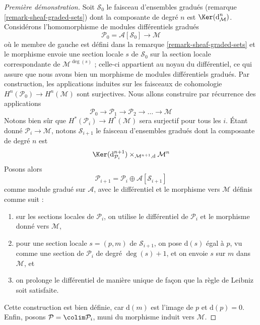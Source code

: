 \begin{proof}[Première démonstration]
Soit $\mathcal{S}_0$ le faisceau d'ensembles
gradués (remarque \ref{remark-sheaf-graded-sets})
dont la composante de degré $n$ est $\Ker(\text{d}_\mathcal{M}^n)$.
Considérons l'homomorphisme de modules différentiels gradués
$$
\mathcal{P}_0 = \mathcal{A}[\mathcal{S}_0] \longrightarrow \mathcal{M}
$$ où
le membre de gauche est défini dans la remarque \ref{remark-sheaf-graded-sets} et
le morphisme envoie une section locale $s$ de $\mathcal{S}_0$ sur
la section locale correspondante de $\mathcal{M}^{\deg(s)}$ ; celle-ci
appartient au noyau du différentiel, ce qui assure que nous avons
bien un morphisme de modules différentiels gradués. Par construction, les
applications induites sur les faisceaux de cohomologie $H^n(\mathcal{P}_0) \to H^n(\mathcal{M})$
sont surjectives. Nous allons construire par récurrence
des applications $$
\mathcal{P}_0 \to \mathcal{P}_1 \to \mathcal{P}_2 \to \ldots \to \mathcal{M}
$$
Notons bien sûr que $H^*(\mathcal{P}_i) \to H^*(\mathcal{M})$ sera
surjectif pour tous les $i$. Étant
donné $\mathcal{P}_i \to \mathcal{M}$, notons $\mathcal{S}_{i + 1}$ le faisceau
d'ensembles gradués dont la composante de degré $n$
est $$
\Ker(\text{d}_{\mathcal{P}_i}^{n + 1})
\times_{\mathcal{M}^{n + 1}, \text{d}}
\mathcal{M}^n
$$ Posons
alors
$$
\mathcal{P}_{i + 1} = \mathcal{P}_i \oplus \mathcal{A}[\mathcal{S}_{i + 1}]
$$ comme module
gradué sur $\mathcal{A}$, avec le différentiel et le morphisme vers
$\mathcal{M}$ définis comme suit :
\begin{enumerate}
\item sur les sections locales de $\mathcal{P}_i$, on utilise le différentiel de
$\mathcal{P}_i$ et le morphisme donné vers $\mathcal{M}$,
\item pour une section locale $s = (p, m)$ de $\mathcal{S}_{i + 1}$, on pose
$\text{d}(s)$ égal à $p$, vu comme une section de $\mathcal{P}_i$ de degré
$\deg(s) + 1$, et on envoie $s$ sur $m$ dans $\mathcal{M}$, et
\item on prolonge le différentiel de manière unique de façon que la règle de Leibniz soit satisfaite.
\end{enumerate}
Cette construction est bien définie, car $\text{d}(m)$ est l'image de $p$
et $\text{d}(p) = 0$.
Enfin, posons $\mathcal{P} = \colim \mathcal{P}_i$, muni du
morphisme induit vers $\mathcal{M}$.


\end{proof}
